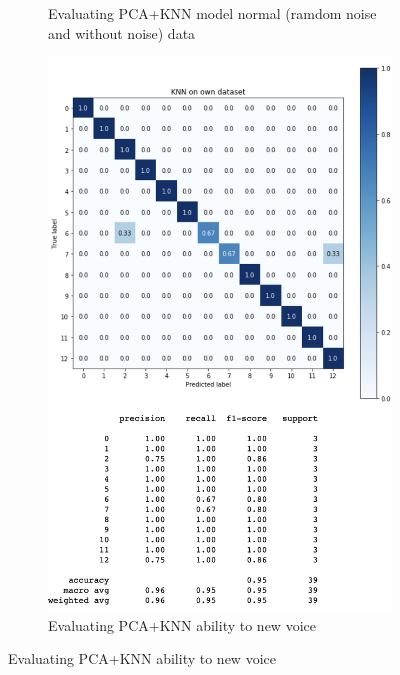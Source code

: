 \documentclass[%
  article,%
  10pt,%
  a4paper,%
  fleqn,%
  oneside,%
  sumario = tradicional,%
  chapter = TITLE,%
  section = TITLE,%
]{abntex2}
\begin{document}
\begin{figure}
\begin{minipage}[b]{.4\textwidth}
\begin{figure}[H]
  \caption{Evaluating PCA+KNN model normal (ramdom noise and without noise) data}
  \label{fig:knnall}
\end{figure}
\end{minipage}\qquad
\begin{minipage}[b]{.4\textwidth}
\begin{figure}[H]
  \centering
  \includegraphics[width = \columnwidth]{./Figuras/knnown}
   \caption{Evaluating PCA+KNN ability to new voice}
   \label{fig:knnown}
\end{figure}
\end{minipage}
\end{figure}
\end{document}
